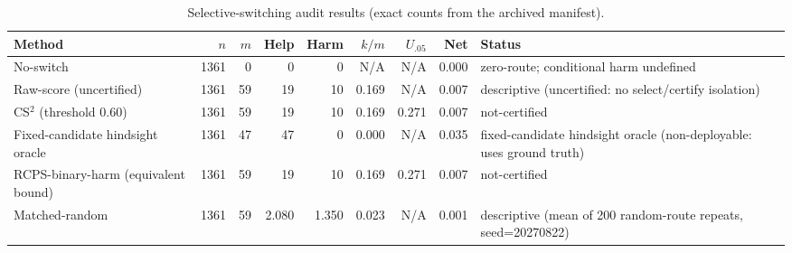 \begin{table}[t]
\centering
\caption{Selective-switching audit results (exact counts from the archived manifest).}
\label{tab:cs2_main}
\begin{tabular}{lrrrrrrrl}
\toprule
Method & $n$ & $m$ & Help & Harm & $k/m$ & $U_{.05}$ & Net & Status \\
\midrule
No-switch & 1361 & 0 & 0 & 0 & N/A & N/A & 0.000 & zero-route; conditional harm undefined \\
Raw-score (uncertified) & 1361 & 59 & 19 & 10 & 0.169 & N/A & 0.007 & descriptive (uncertified: no select/certify isolation) \\
CS$^2$ (threshold 0.60) & 1361 & 59 & 19 & 10 & 0.169 & 0.271 & 0.007 & not-certified \\
Fixed-candidate hindsight oracle & 1361 & 47 & 47 & 0 & 0.000 & N/A & 0.035 & fixed-candidate hindsight oracle (non-deployable: uses ground truth) \\
RCPS-binary-harm (equivalent bound) & 1361 & 59 & 19 & 10 & 0.169 & 0.271 & 0.007 & not-certified \\
Matched-random & 1361 & 59 & 2.080 & 1.350 & 0.023 & N/A & 0.001 & descriptive (mean of 200 random-route repeats, seed=20270822) \\
\bottomrule
\end{tabular}
\end{table}
